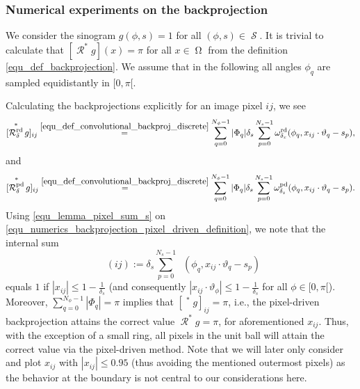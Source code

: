 \documentclass[11pt,reqno]{amsart}
\newcommand{\sums}{\sum_{p=0}^{N_s-1}}
\newcommand{\sumphi}{\sum_{q=0}^{N_\phi-1}}
\DeclareMathOperator{\Radon}{\mathcal{R}}
\DeclareMathOperator{\RayRadon}{\mathcal{R}^\mathrm{rd}_{\delta}}
\DeclareMathOperator{\PixelRadon}{\mathcal{R}^\mathrm{pd}_{\delta}}
\DeclareMathOperator{\RayWeight}{\omega^\mathrm{rd}_{\delta_\mathit{x}}}
\DeclareMathOperator{\PixelWeight}{\omega^\mathrm{pd}_{\delta_\mathit{s}}}
\DeclareMathOperator{\imgdom}{\Omega}
\DeclareMathOperator{\sinodom}{\mathcal{S}}
\DeclareMathOperator{\PixelFq}{F^\mathrm{pd}_q}
\numberwithin{theorem}{section}
\theoremstyle{remark}
\begin{document}

\subsubsection{Numerical experiments on the backprojection}
We consider the sinogram $g(\phi,s)= 1$ for all $(\phi,s)\in \sinodom$. It is trivial to calculate that $[\Radon^* g ](x) = \pi$ for all $x \in \imgdom$ from the definition \eqref{equ_def_backprojection}. We assume that in the following all angles $\phi_q$ are sampled equidistantly in $[0,\pi[$.

Calculating the backprojections explicitly for an image pixel $ij$, we see
\begin{equation}\label{equ_numerics_backprojection_ray_driven_definition}
[\RayRadon^* g]_{ij} \overset{\eqref{equ_def_convolutional_backproj_discrete}}{=} \sumphi |\Phi_q| \delta_s \sums \RayWeight(\phi_q,x_{ij}\cdot \vartheta_q-s_p),
\end{equation}
and 
\begin{equation}\label{equ_numerics_backprojection_pixel_driven_definition}
[\PixelRadon^* g]_{ij} \overset{\eqref{equ_def_convolutional_backproj_discrete}}{=}  \sumphi |\Phi_q| \delta_s\sums \PixelWeight(\phi_q,x_{ij}\cdot \vartheta_q-s_p).
\end{equation}
Using \eqref{equ_lemma_pixel_sum_s} on \eqref{equ_numerics_backprojection_pixel_driven_definition}, we note that the internal sum 
\[\PixelFq(ij):= \delta_s\sums \PixelWeight(\phi_q,x_{ij}\cdot \vartheta_q-s_p)\] equals $1$ if $|x_{ij}|\leq 1-  \frac1 {\delta_s}$ (and consequently $|x_{ij}\cdot \vartheta_\phi|\leq 1 -\frac{1}{\delta_s}$ for all $\phi\in [0,\pi[$).
Moreover, $\sumphi |\Phi_q| = \pi$ implies that $[\PixelRadon^* g]_{ij} = \pi$, i.e., the pixel-driven backprojection attains the correct value $\Radon^*g=\pi$, for aforementioned $x_{ij}$.  Thus, with the exception of a small ring, all pixels in the unit ball will attain the correct value via the pixel-driven method. Note that we will later only consider and plot $x_{ij}$ with $|x_{ij}|\leq 0.95$ (thus avoiding the mentioned outermost pixels) as the behavior at the boundary is not central to our considerations here.
\end{document}
